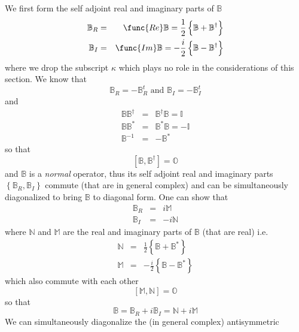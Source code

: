 \documentclass[aps,preprint]{revtex4}
\begin{document}
We first form the self adjoint real and imaginary parts of $\mathbb{B}$ 
\begin{eqnarray}
\mathbb{B}_{R} &=&\func{Re}\mathbb{B}=\frac{1}{2}\left\{ \mathbb{B+B}%
^{\dagger }\right\}   \nonumber \\
\mathbb{B}_{I} &=&\func{Im}\mathbb{B}=-\frac{i}{2}\left\{ \mathbb{B-B}%
^{\dagger }\right\} 
\end{eqnarray}%
where we drop the subscript $\kappa $ which plays no role in the
considerations of this section. We know that 
\begin{equation}
\mathbb{B}_{R}=-\mathbb{B}_{R}^{t}\text{ and }\mathbb{B}_{I}=-\mathbb{B}%
_{I}^{t}
\end{equation}%
and 
\begin{eqnarray}
\mathbb{BB}^{\dagger } &=&\mathbb{B}^{\dagger }\mathbb{B=I}  \nonumber \\
\mathbb{BB}^{\ast } &=&\mathbb{B^{\ast }B}=-\mathbb{I}  \nonumber \\
\mathbb{B}^{-1} &=&-\mathbb{B^{\ast }}\text{ }
\end{eqnarray}%
so that 
\begin{equation}
\left[ \mathbb{B},\mathbb{B}^{\dagger }\right] =\mathbb{O}
\end{equation}%
and $\mathbb{B}$ is a \emph{normal }operator, thus its self adjoint real and
imaginary parts $\left\{ \mathbb{B}_{R},\mathbb{B}_{I}\right\} $ commute
(that are in general complex) and can be simultaneously diagonalized to
bring $\mathbb{B}$  to diagonal form. One can show that 
\begin{eqnarray}
\mathbb{B}_{R} &=&i\mathbb{M}  \nonumber \\
\mathbb{B}_{I} &=&-i\mathbb{N}
\end{eqnarray}%
where $\mathbb{N}$ and $\mathbb{M}$ are the real and imaginary parts of $%
\mathbb{B}$ (that are real) i.e. 
\begin{eqnarray}
\mathbb{N} &=&\frac{1}{2}\left\{ \mathbb{B+B}^{\ast }\right\}   \nonumber \\
\mathbb{M} &=&-\frac{i}{2}\left\{ \mathbb{B-B}^{\ast }\right\} 
\end{eqnarray}%
which also commute with each other 
\begin{equation}
\left[ \mathbb{M},\mathbb{N}\right] =\mathbb{O}
\end{equation}%
so that 
\begin{equation}
\mathbb{B=B}_{R}+i\mathbb{B}_{I}=\mathbb{N}+i\mathbb{M}
\end{equation}%
We can simultaneously diagonalize the (in general complex) antisymmetric
\end{document}
